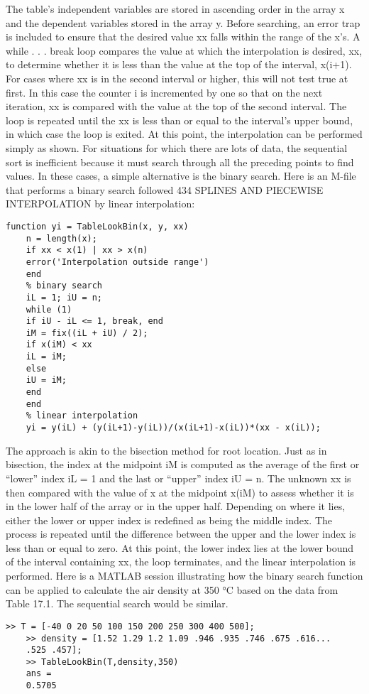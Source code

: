 \documentclass[../main.tex]{subfiles}
\begin{document}
The table’s independent variables are stored in ascending order in the array x and the
dependent variables stored in the array y. Before searching, an error trap is included to ensure that the desired value xx falls within the range of the x’s. A while . . . break loop
compares the value at which the interpolation is desired, xx, to determine whether it is less
than the value at the top of the interval, x(i+1). For cases where xx is in the second interval or higher, this will not test true at first. In this case the counter i is incremented by one
so that on the next iteration, xx is compared with the value at the top of the second interval. The loop is repeated until the xx is less than or equal to the interval’s upper bound, in
which case the loop is exited. At this point, the interpolation can be performed simply as
shown.
For situations for which there are lots of data, the sequential sort is inefficient because
it must search through all the preceding points to find values. In these cases, a simple
alternative is the binary search. Here is an M-file that performs a binary search followed
434 SPLINES AND PIECEWISE INTERPOLATION
by linear interpolation:
\begin{lstlisting}[numbers=none]
    function yi = TableLookBin(x, y, xx)
    n = length(x);
    if xx < x(1) | xx > x(n)
    error('Interpolation outside range')
    end
    % binary search
    iL = 1; iU = n;
    while (1)
    if iU - iL <= 1, break, end
    iM = fix((iL + iU) / 2);
    if x(iM) < xx
    iL = iM;
    else
    iU = iM;
    end
    end
    % linear interpolation
    yi = y(iL) + (y(iL+1)-y(iL))/(x(iL+1)-x(iL))*(xx - x(iL));
\end{lstlisting}

The approach is akin to the bisection method for root location. Just as in bisection, the
index at the midpoint iM is computed as the average of the first or “lower” index iL = 1
and the last or “upper” index iU = n. The unknown xx is then compared with the value of
x at the midpoint x(iM) to assess whether it is in the lower half of the array or in the upper
half. Depending on where it lies, either the lower or upper index is redefined as being the
middle index. The process is repeated until the difference between the upper and the lower
index is less than or equal to zero. At this point, the lower index lies at the lower bound of
the interval containing xx, the loop terminates, and the linear interpolation is performed.
Here is a MATLAB session illustrating how the binary search function can be applied
to calculate the air density at 350 °C based on the data from Table 17.1. The sequential
search would be similar.
\begin{lstlisting}[numbers=none]
    >> T = [-40 0 20 50 100 150 200 250 300 400 500];
    >> density = [1.52 1.29 1.2 1.09 .946 .935 .746 .675 .616...
    .525 .457];
    >> TableLookBin(T,density,350)
    ans =
    0.5705
\end{lstlisting}
\end{document}
